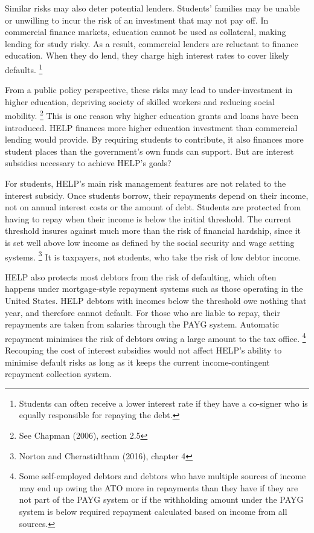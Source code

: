 \documentclass[embargoed]{grattan}
\begin{document}
{Similar risks may also deter potential lenders.
Students' families may be unable or unwilling to incur the risk of an investment that may not pay off.
In commercial finance markets, education cannot be used as collateral, making lending for study risky.
As a result, commercial lenders are reluctant to finance education.
When they do lend, they charge high interest rates to cover likely defaults.%
\footnote{Students can often receive a lower interest rate if they have a co-signer who is equally responsible for repaying the debt.}

From a public policy perspective, these risks may lead to under-investment in higher education, depriving society of skilled workers and reducing social mobility.%
\footnote{See Chapman (2006), section 2.5} This is one reason why higher education grants and loans have been introduced.
\gls{HELP} finances more higher education investment than commercial lending would provide.
By requiring students to contribute, it also finances more student places than the government's own funds can support.
But are interest subsidies necessary to achieve \gls{HELP}'s goals?

For students, \gls{HELP}'s main risk management features are not related to the interest subsidy.
Once students borrow, their repayments depend on their income, not on annual interest costs or the amount of debt.
Students are protected from having to repay when their income is below the initial threshold.
The current threshold insures against much more than the risk of financial hardship, since it is set well above low income as defined by the social security and wage setting systems.%
\footnote{Norton and Cherastidtham (2016), chapter 4} It is taxpayers, not students, who take the risk of low debtor income.

\gls{HELP} also protects most debtors from the risk of defaulting, which often happens under mortgage-style repayment systems such as those operating in the United States.
\gls{HELP} debtors with incomes below the threshold owe nothing that year, and therefore cannot default.
For those who are liable to repay, their repayments are taken from salaries through the \gls{PAYG} system.
Automatic repayment minimises the risk of debtors owing a large amount to the tax office.%
\footnote{Some self-employed debtors and debtors who have multiple sources of income may end up owing the \gls{ATO} more in repayments than they have if they are not part of the \gls{PAYG} system or if the withholding amount under the \gls{PAYG} system is below required repayment calculated based on income from all sources.} Recouping the cost of interest subsidies would not affect \gls{HELP}'s ability to minimise default risks as long as it keeps the current income-contingent repayment collection system.

}
\end{document}
